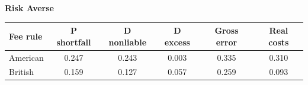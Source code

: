 \documentclass[10pt,border=5pt,varwidth=17cm]{standalone}
\begin{document}
\begingroup
\small
\setlength{\tabcolsep}{5pt}
\renewcommand{\arraystretch}{1.20}
\noindent\textbf{Risk Averse}\par\smallskip
\noindent\begin{tabularx}{\linewidth}{@{}>{\raggedright\arraybackslash}Xccccc@{}}
\toprule
\textbf{Fee rule} & \textbf{P shortfall} & \textbf{D nonliable} & \textbf{D excess} & \textbf{Gross error} & \textbf{Real costs} \\
\midrule
American & 0.247 & 0.243 & 0.003 & 0.335 & 0.310 \\
British & 0.159 & 0.127 & 0.057 & 0.259 & 0.093 \\
\bottomrule\end{tabularx}\par\medskip
\endgroup
\end{document}
